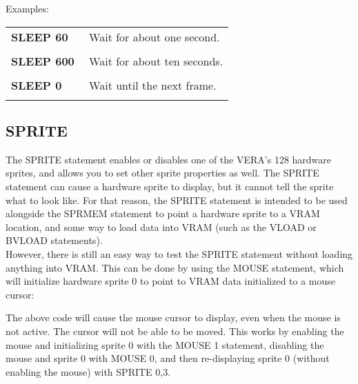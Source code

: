Examples:\\

\begin{tabular}{l p{0.65\linewidth}}

	{\ttfamily\bfseries SLEEP 60}&Wait for about one second.\\\\

	{\ttfamily\bfseries SLEEP 600}&Wait for about ten seconds.\\\\

	{\ttfamily\bfseries SLEEP 0}&Wait until the next frame.\\\\

\end{tabular}

\subsection{SPRITE}

The {\ttfamily SPRITE} statement enables or disables one of the VERA's 128
hardware sprites, and allows you to set other sprite properties as well.  The
{\ttfamily SPRITE} statement can cause a hardware sprite to display, but it
cannot tell the sprite what to look like.  For that reason, the {\ttfamily
SPRITE} statement is intended to be used alongside the {\ttfamily SPRMEM}
statement to point a hardware sprite to a VRAM location, and some way to load
data into VRAM (such as the {\ttfamily VLOAD} or {\ttfamily BVLOAD}
statements).\\

However, there is still an easy way to test the {\ttfamily SPRITE} statement
without loading anything into VRAM.  This can be done by using the {\ttfamily
MOUSE} statement, which will initialize hardware sprite 0 to point to VRAM data
initialized to a mouse cursor:\\


The above code will cause the mouse cursor to display, even when the mouse is
not active.  The cursor will not be able to be moved.  This works by enabling
the mouse and initializing sprite 0 with the {\ttfamily MOUSE 1} statement,
disabling the mouse and sprite 0 with {\ttfamily MOUSE 0}, and then
re-displaying sprite 0 (without enabling the mouse) with {\ttfamily SPRITE
0,3}.\\

